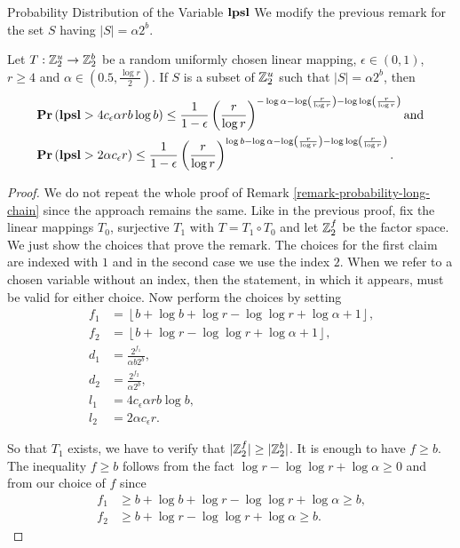 \begin{section}{Probability Distribution of the Variable \texorpdfstring{$\mathbf{lpsl}$}{lpsl}}
We modify the previous remark for the set $S$ having $|S| = \alpha 2 ^ b$.
\begin{remark}
\label{remark-lpsl-pdf-linear-amount}
Let $T: \mathbb{Z}_{2}^{u} \rightarrow \mathbb{Z}_{2}^{b}$ be a random uniformly chosen linear mapping, $\epsilon \in (0, 1)$, $r \geq 4$ and $\alpha \in (0.5, \frac{\log r}{2})$. If $S$ is a subset of $\mathbb{Z}_{2}^{u}$ such that $|S| = \alpha 2 ^ b$, then
\[
\begin{split}
& \mathbf{Pr}\left(\mathbf{lpsl} > 4 c_\epsilon \alpha r b \log b\right) \leq \frac{1}{1 - \epsilon} \left(\frac{r}{\log r}\right)^{-\log \alpha - \log \left(\frac{r}{\log r}\right) - \log \log \left(\frac{r}{\log r}\right)} \text{and} \\
& \mathbf{Pr}\left(\mathbf{lpsl} > 2 \alpha c_\epsilon r\right) \leq \frac{1}{1 - \epsilon}\left(\frac{r}{\log r}\right)^{\log b - \log \alpha - \log \left(\frac{r}{\log r}\right) - \log \log \left(\frac{r}{\log r}\right)} \text{.}
\end{split}
\]
\end{remark}
\begin{proof}
We do not repeat the whole proof of Remark \ref{remark-probability-long-chain} since the approach remains the same. Like in the previous proof, fix the linear mappings $T_0$, surjective $T_1$ with $T = T_1 \circ T_0$ and let $\mathbb{Z}_{2}^{f}$ be the factor space. We just show the choices that prove the remark. The choices for the first claim are indexed with $1$ and in the second case we use the index $2$. When we refer to a chosen variable without an index, then the statement, in which it appears, must be valid for either choice.
Now perform the choices by setting
\[
\begin{split}
	f_1 & = \left\lfloor b + \log b + \log r - \log \log r + \log \alpha + 1 \right\rfloor \text{,} \\
	f_2 & = \left\lfloor b + \log r - \log \log r + \log \alpha + 1 \right\rfloor \text{,} \\
	d_1 & = \frac{2 ^ {f_1}}{\alpha b 2 ^ b} \text{,} \\
	d_2 & = \frac{2 ^ {f_2}}{\alpha 2 ^ b} \text{,} \\
	l_1 & = 4 c_\epsilon \alpha r b \log b \text{,} \\
	l_2 & = 2 \alpha c_\epsilon r \text{.}
\end{split}
\]

So that $T_1$ exists, we have to verify that $|\mathbb{Z}_{2}^{f}| \geq |\mathbb{Z}_{2}^{b}|$. It is enough to have $f \geq b$. The inequality $f \geq b$ follows from the fact $\log r - \log \log r + \log \alpha \geq 0$ and from our choice of $f$ since
\[
\begin{split}
	f_1 & \geq b + \log b + \log r - \log \log r + \log \alpha \geq b \text{,} \\
	f_2 & \geq b + \log r - \log \log r + \log \alpha \geq b \text{.}
\end{split}
\]


\end{proof}
\end{section}
